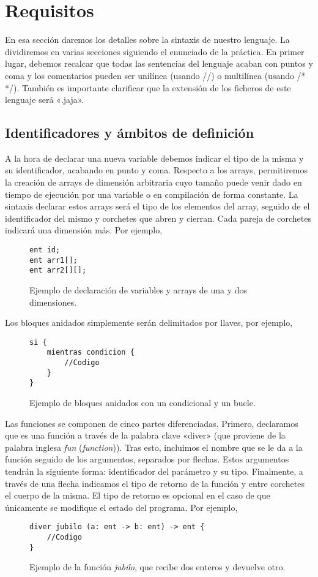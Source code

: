 \chapter*{Requisitos}
En esa sección daremos los detalles sobre la sintaxis de nuestro lenguaje. La
dividiremos en varias secciones siguiendo el enunciado de la práctica. En primer
lugar, debemos recalcar que todas las sentencias del lenguaje acaban con puntos
y coma y los comentarios pueden ser unilínea (usando //) o multilínea (usando /*
*/). También es importante clarificar que la extensión de los ficheros de este
lenguaje será «.jaja».
\section*{Identificadores y ámbitos de definición}
A la hora de declarar una nueva variable debemos indicar el tipo de la misma y
su identificador, acabando en punto y coma. Respecto a los arrays,
permitiremos la creación de arrays de dimensión arbitraria cuyo tamaño puede
venir dado en tiempo de ejecución por una variable o en compilación de forma
constante. La sintaxis declarar estos arrays será el tipo de los elementos del
array, seguido de el identificador del mismo y corchetes que abren y cierran.
Cada pareja de corchetes indicará una dimensión más.
Por ejemplo,
\begin{figure}[H]
    \centering
    \begin{lstlisting}
ent id;
ent arr1[];
ent arr2[][];
    \end{lstlisting}
    \caption{Ejemplo de declaración de variables y arrays de una y dos
    dimensiones.}
\end{figure}

Los bloques anidados simplemente serán delimitados por llaves, por ejemplo,
\begin{figure}[H]
    \centering
    \begin{lstlisting}
si {
    mientras condicion {
        //Codigo
    }
}
    \end{lstlisting}
    \caption{Ejemplo de bloques anidados con un condicional y un bucle.}
\end{figure}

Las funciones se componen de cinco partes diferenciadas. Primero, declaramos que
es una función a través de la palabra clave «diver» (que proviene de la palabra
inglesa \textit{fun} (\textit{function})). Tras esto, incluimos el nombre que se
le da a la función seguido de los argumentos, separados por flechas. Estos
argumentos tendrán la siguiente forma: identificador del parámetro y su tipo.
Finalmente, a través de una flecha indicamos el tipo de retorno de la función y
entre corchetes el cuerpo de la misma. El tipo de retorno es opcional en el caso
de que únicamente se modifique el estado del programa. Por ejemplo,
\begin{figure}[H]
    \centering
    \begin{lstlisting}
diver jubilo (a: ent -> b: ent) -> ent {
    //Codigo
}
    \end{lstlisting}
    \caption{Ejemplo de la función \textit{jubilo}, que recibe dos enteros y
    devuelve otro.}
\end{figure}

